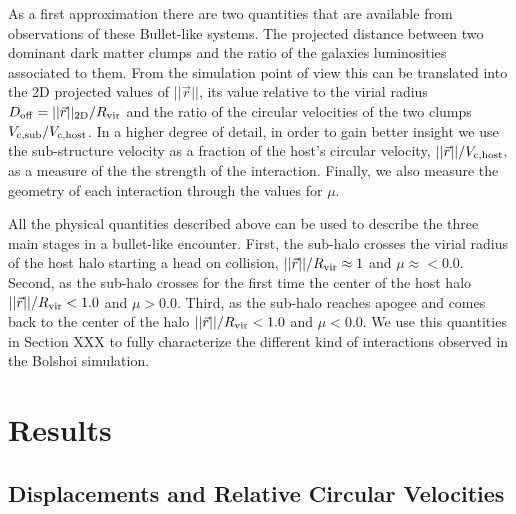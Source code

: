 \documentclass{emulateapj}
\begin{document}
As a first approximation there are two quantities that are available
from observations of these Bullet-like systems. The projected distance
between two dominant dark matter clumps and the ratio of the
galaxies luminosities associated to them. From the simulation point
of view this can be translated into the 2D projected values of
$||\vec{r}||$, its value relative to the virial radius $D_{\rm off}=
||\vec{r}||_{\rm 2D}/R_{\rm vir}$ and the ratio of the circular velocities
of the two clumps $V_{\rm c,sub}/V_{\rm c,host}$. In a higher degree
of detail, in order to gain better insight we use
the sub-structure velocity as a fraction of the host's circular
velocity, $||\vec{r}||/V_{\rm c, host}$, as a measure of the the strength
of the interaction.  Finally, we also measure the geometry of each
interaction through the values for $\mu$.


All the physical quantities described above can be used to describe
the three main stages in a bullet-like encounter. First, the sub-halo
crosses the virial radius of the host halo starting a head on
collision, $||\vec{r}||/R_{\rm vir}\approx 1$ and
$\mu\approx<0.0$. Second, as the sub-halo crosses for the first time
the center of the host halo $||\vec{r}||/R_{\rm vir} < 1.0$ and
$\mu>0.0$. Third, as the sub-halo reaches apogee and comes back to the
center of the halo $||\vec{r}||/R_{\rm vir} < 1.0$ and $\mu<0.0$. We use
this quantities in Section XXX to fully characterize the different
kind of interactions observed in the Bolshoi simulation. 



\section{Results}
\label{sec:results}

\subsection{Displacements and Relative Circular Velocities}
\label{fig:displacement}
\end{document}
